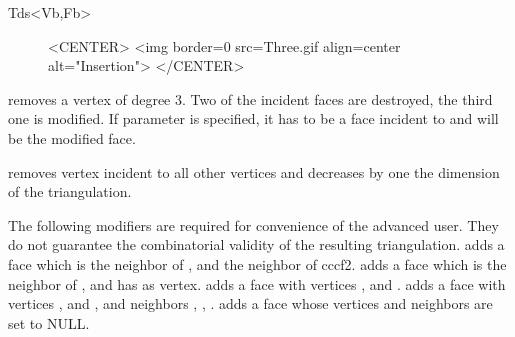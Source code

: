 \begin{ccClassTemplate}{Tds<Vb,Fb>}
\begin{figure}
\begin{ccHtmlOnly}
<CENTER>
<img border=0 src=Three.gif align=center alt="Insertion">
</CENTER>
\end{ccHtmlOnly} 
\end{figure}



{removes a vertex of degree 3. Two of the incident faces are destroyed,
the third one is modified.
If parameter   is specified, it has to be a face incident to 
and will be the modified face.
}



\ccGlue
{}
\ccGlue
{}
{removes vertex  incident to all other vertices
and  decreases by one the dimension of the triangulation.
 }

\begin{ccAdvanced}
The following modifiers are required for convenience of the advanced
user.
They do not guarantee the combinatorial validity 
of the resulting triangulation.
\ccGlue
{}
{adds a face which is the neighbor  of , 
and the neighbor  of ccc{f2}.}
\ccGlue
{}
{adds a face which is the neighbor  of ,
and has  as vertex.}
\ccGlue
{}
{adds a face with vertices ,  and .}
\ccGlue
{}
{adds a face with vertices ,  and ,
and neighbors , , .}
\ccGlue
{}
{adds a face whose vertices and neighbors are set to NULL.}
 \ccGlue
{}
\end{ccAdvanced}



\end{ccClassTemplate}
